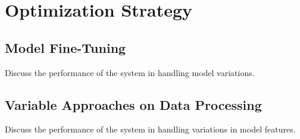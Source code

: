 \section{Optimization Strategy}
\label{sec:optimization}

\subsection{Model Fine-Tuning}
Discuss the performance of the system in handling model variations.

\subsection{Variable Approaches on Data Processing}
Discuss the performance of the system in handling variations in model features.
